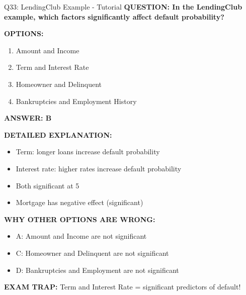 \documentclass[8pt]{beamer}
\begin{document}
	\begin{frame}{Q33: LendingClub Example - Tutorial}
		\fontsize{6.5}{7.5}\selectfont
		\textbf{QUESTION: In the LendingClub example, which factors significantly affect default probability?}
		
		\vspace{0.1cm}
		\textbf{OPTIONS:}
		\begin{enumerate}
			\item Amount and Income
			\item Term and Interest Rate
			\item Homeowner and Delinquent
			\item Bankruptcies and Employment History
		\end{enumerate}
		
		\vspace{0.1cm}
		\textcolor{myblue}{\textbf{ANSWER: B}}
		
		\vspace{0.1cm}
		\textbf{DETAILED EXPLANATION:}
		\begin{itemize}
			\item Term: longer loans increase default probability
			\item Interest rate: higher rates increase default probability
			\item Both significant at 5%
			\item Mortgage has negative effect (significant)
		\end{itemize}
		
		\vspace{0.1cm}
		\textcolor{myred}{\textbf{WHY OTHER OPTIONS ARE WRONG:}}
		\begin{itemize}
			\item \textcolor{myred}{A:} Amount and Income are not significant
			\item \textcolor{myred}{C:} Homeowner and Delinquent are not significant
			\item \textcolor{myred}{D:} Bankruptcies and Employment are not significant
		\end{itemize}
		
		\textcolor{myred}{\textbf{EXAM TRAP:}} Term and Interest Rate = \textcolor{myblue}{significant predictors} of default!
	\end{frame}
	
\end{document}
